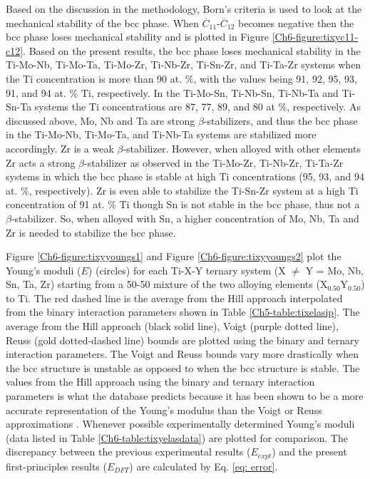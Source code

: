 Based on the discussion in the methodology, Born's criteria is used to look at the mechanical stability of the bcc phase. When $\overline{C}_{11}$-$\overline{C}_{12}$ becomes negative then the bcc phase loses mechanical stability and is plotted in Figure \ref{Ch6-figure:tixyc11-c12}. Based on the present results, the bcc phase loses mechanical stability in the Ti-Mo-Nb, Ti-Mo-Ta, Ti-Mo-Zr, Ti-Nb-Zr, Ti-Sn-Zr, and Ti-Ta-Zr systems when the Ti concentration is more than 90 at. \%, with the values being 91, 92, 95, 93, 91, and 94 at. \% Ti, respectively. In the Ti-Mo-Sn, Ti-Nb-Sn, Ti-Nb-Ta and Ti-Sn-Ta systems the Ti concentrations are 87, 77, 89, and 80 at \%, respectively. As discussed above, Mo, Nb and Ta are strong $\beta$-stabilizers, and thus the bcc phase in the Ti-Mo-Nb, Ti-Mo-Ta, and Ti-Nb-Ta systems are stabilized more accordingly. Zr is a weak $\beta$-stabilizer. However, when alloyed with other elements Zr acts a strong $\beta$-stabilizer as observed in the Ti-Mo-Zr, Ti-Nb-Zr, Ti-Ta-Zr systems in which the bcc phase is stable at high Ti concentrations (95, 93, and 94 at. \%, respectively). Zr is even able to stabilize the Ti-Sn-Zr system at a high Ti concentration of 91 at. \% Ti though Sn is not stable in the bcc phase, thus not a $\beta$-stabilizer. So, when alloyed with Sn, a higher concentration of Mo, Nb, Ta and Zr is needed to stabilize the bcc phase. 

Figure \ref{Ch6-figure:tixyyoungs1} and Figure \ref{Ch6-figure:tixyyoungs2} plot the Young's moduli ($E$) (circles) for each Ti-X-Y ternary system (X $\neq$ Y = Mo, Nb, Sn, Ta, Zr) starting from a 50-50 mixture of the two alloying elements (X$_{0.50}$Y$_{0.50}$) to Ti. The red dashed line is the average from the Hill approach interpolated from the binary interaction parameters shown in Table \ref{Ch5-table:tixelasip}. The average from the Hill approach (black solid line), Voigt (purple dotted line), Reuss (gold dotted-dashed line) bounds are plotted using the binary and ternary interaction parameters. The Voigt and Reuss bounds vary more drastically when the bcc structure is unstable as opposed to when the bcc structure is stable. The values from the Hill approach using the binary and ternary interaction parameters is what the database predicts because it has been shown to be a more accurate representation of the Young's modulus than the Voigt or Reuss approximations \cite{Yue2009,Chung1967}. Whenever possible experimentally determined Young's moduli \cite{Niinomi2012,Mohammed2014,Nozoe2007,Geetha2009} (data listed in Table \ref{Ch6-table:tixyelasdata}) are plotted for comparison. The discrepancy between the previous experimental results ($E_{expt}$) and the present first-principles results ($E_{DFT}$) are calculated by Eq. \ref{eq: error}.

